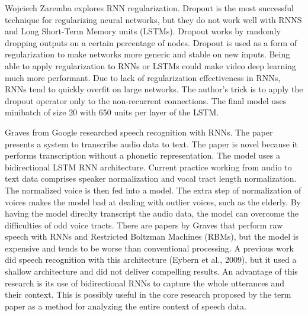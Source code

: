 Wojciech Zaremba explores RNN regularization.  Dropout is the most successful technique for regularizing neural networks, but they do not work well with RNNS and Long Short-Term Memory units (LSTMs).  Dropout works by randomly dropping outputs on a certain percentage of nodes.  Dropout is used as a form of regularization to make networks more generic and stable on new inputs.  Being able to apply regularization to RNNs or LSTMs could make video deep learning much more performant.  Due to lack of regularization effectiveness in RNNs, RNNs tend to quickly overfit on large networks.  The author's trick is to apply the dropout operator only to the non-recurrent connections.  The final model uses minibatch of size 20 with 650 units per layer of the LSTM.

Graves from Google researched speech recognition with RNNs.  The paper presents a system to transcribe audio data to text.  The paper is novel because it performs transcription without a phonetic representation.  The model uses a bidirectional LSTM RNN architecture.  Current practice working from audio to text data comprises speaker normalization and vocal tract length normalization.  The normalized voice is then fed into a model.  The extra step of normalization of voices makes the model bad at dealing with outlier voices, such as the elderly.  By having the model direclty transcript the audio data, the model can overcome the difficulties of odd voice tracts.  There are papers by Graves that perform raw speech with RNNs and Restricted Boltzman Machines (RBMs), but the model is expensive and tends to be worse than conventional processing.  A previous work did speech recognition with this architecture (Eybern et al., 2009), but it used a shallow architecture and did not deliver compelling results. An advantage of this research is its use of bidirectional RNNs to capture the whole utterances and their context.  This is possibly useful in the core research proposed by the term paper as a method for analyzing the entire context of speech data.


